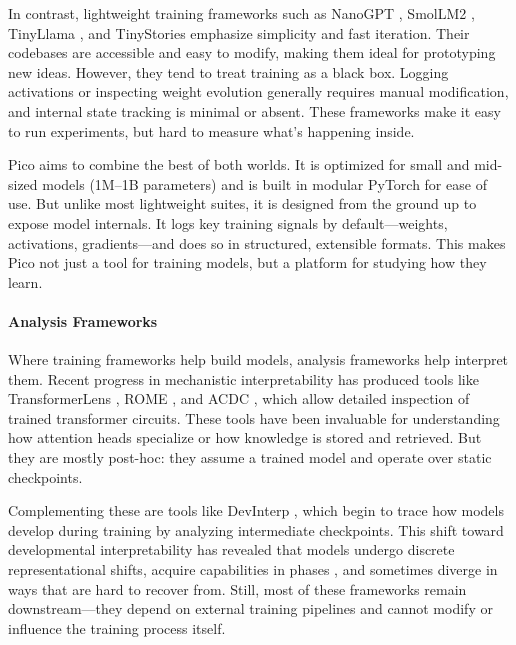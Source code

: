 In contrast, lightweight training frameworks such as NanoGPT \citep{karpathy2023nanogpt}, SmolLM2 \citep{allal2025smollm2}, TinyLlama \citep{zhang2024tinyllama}, and TinyStories \citep{eldan2023tinystories} emphasize simplicity and fast iteration. Their codebases are accessible and easy to modify, making them ideal for prototyping new ideas. However, they tend to treat training as a black box. Logging activations or inspecting weight evolution generally requires manual modification, and internal state tracking is minimal or absent. These frameworks make it easy to run experiments, but hard to measure what's happening inside.

Pico aims to combine the best of both worlds. It is optimized for small and mid-sized models (1M--1B parameters) and is built in modular PyTorch for ease of use. But unlike most lightweight suites, it is designed from the ground up to expose model internals. It logs key training signals by default—weights, activations, gradients—and does so in structured, extensible formats. This makes Pico not just a tool for training models, but a platform for studying how they learn.

\paragraph{Analysis Frameworks}
Where training frameworks help build models, analysis frameworks help interpret them. Recent progress in mechanistic interpretability has produced tools like TransformerLens \citep{nanda2022transformerlens}, ROME \citep{meng2022locating}, and ACDC \citep{conmy2023towards}, which allow detailed inspection of trained transformer circuits. These tools have been invaluable for understanding how attention heads specialize or how knowledge is stored and retrieved. But they are mostly post-hoc: they assume a trained model and operate over static checkpoints.

Complementing these are tools like DevInterp \citep{devinterpcode}, which begin to trace how models develop during training by analyzing intermediate checkpoints. This shift toward developmental interpretability has revealed that models undergo discrete representational shifts, acquire capabilities in phases \citep{hoogland2023towards, hoogland2025losslandscape}, and sometimes diverge in ways that are hard to recover from. Still, most of these frameworks remain downstream—they depend on external training pipelines and cannot modify or influence the training process itself.

